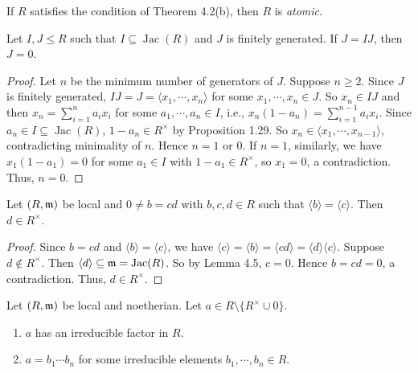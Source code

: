 \begin{definition}
    If $R$ satisfies the condition of Theorem 4.2(b), then $R$ is \emph{atomic}.
\end{definition}

\begin{lemma}
    Let $I,J \leq R$ such that $I \subseteq \operatorname{Jac}(R)$ and $J$ is finitely generated. If $J = IJ$, then $J = 0$.
\end{lemma}

\begin{proof}
    Let $n$ be the minimum number of generators of $J$. Suppose $n \geq 2$. Since $J$ is finitely generated, $IJ = J = \langle x_1,\cdots,x_n \rangle$ for some $x_1,\cdots,x_n \in J$. So $x_n \in IJ$ and then $x_n = \sum_{i=1}^{n}a_ix_i$ for some $a_1,\cdots,a_n \in I$, i.e., $x_n(1-a_n) = \sum_{i=1}^{n-1}a_ix_i$. Since $a_n \in I \subseteq \operatorname{Jac}(R)$, $1-a_n \in R^{\times}$ by Proposition 1.29. So $x_n \in \langle x_1,\cdots,x_{n-1} \rangle$, contradicting minimality of $n$. Hence $n = 1$ or $0$. If $n = 1$, similarly, we have $x_1(1-a_1) = 0$ for some $a_1 \in I$ with $1-a_1 \in R^{\times}$, so $x_1 = 0$, a contradiction. Thus, $n = 0$.
\end{proof}

\begin{lemma}
    Let $(R,\mathfrak{m})$ be local and $0 \neq b = cd$ with $b,c,d \in R$ such that $\langle b \rangle = \langle c \rangle$. Then $d \in R^{\times}$.
\end{lemma}

\begin{proof}
    Since $b = cd$ and $\langle b \rangle = \langle c \rangle$, we have $\langle c \rangle = \langle b \rangle = \langle cd \rangle = \langle d \rangle \langle c \rangle$. Suppose $d \not \in R^{\times}$. Then $\langle d \rangle \subseteq \mathfrak{m} = \operatorname{Jac}(R)$. So by Lemma 4.5, $c = 0$. Hence $b = cd = 0$, a contradiction. Thus, $d \in R^{\times}$.
\end{proof}

\begin{theorem}
    Let $(R,\mathfrak{m})$ be local and noetherian. Let $a \in R \setminus \{R^{\times} \cup 0\}$. 
    \begin{enumerate}
        \item $a$ has an irreducible factor in $R$.
        \item $a = b_1 \cdots b_n$ for some irreducible elements $b_1,\cdots,b_n \in R$.
    \end{enumerate}
\end{theorem}

